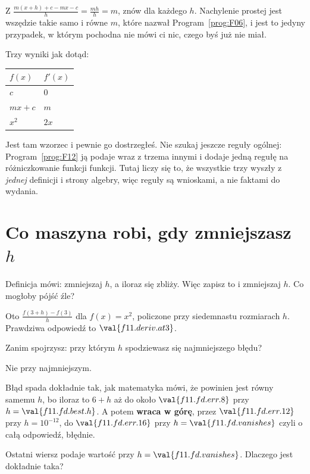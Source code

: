 \begin{fr}
Z $\frac{m(x+h) + c - mx - c}{h} = \frac{mh}{h} = m$, znów dla każdego $h$.
Nachylenie prostej jest wszędzie takie samo i równe $m$, które nazwał
Program~\ref{prog:F06}, i jest to jedyny przypadek, w którym pochodna nie mówi
ci nic, czego byś już nie miał.

Trzy wyniki jak dotąd:

\begin{center}
\begin{tabular}{ll}
\toprule
$f(x)$ & $f'(x)$ \\
\midrule
$c$ & $0$ \\
$mx + c$ & $m$ \\
$x^{2}$ & $2x$ \\
\bottomrule
\end{tabular}
\end{center}

Jest tam wzorzec i pewnie go dostrzegłeś. Nie szukaj jeszcze reguły ogólnej:
Program~\ref{prog:F12} ją podaje wraz z trzema innymi i dodaje jedną regułę na
różniczkowanie funkcji funkcji. Tutaj liczy się to, że wszystkie trzy wyszły z \emph{jednej}
definicji i strony algebry, więc reguły są wnioskami, a nie faktami do
wydania.
\end{fr}

\section{Co maszyna robi, gdy zmniejszasz $h$}
\label{sec:F11-machine}

\begin{fr}
Definicja mówi: zmniejszaj $h$, a iloraz się zbliży. Więc zapisz to i
zmniejszaj $h$. Co mogłoby pójść źle?

Oto $\frac{f(3+h) - f(3)}{h}$ dla $f(x) = x^{2}$, policzone przy siedemnastu
rozmiarach $h$. Prawdziwa odpowiedź to $\val{f11.deriv.at3}$.

Zanim spojrzysz: przy którym $h$ spodziewasz się najmniejszego błędu?
\dotline
\nextframe
\end{fr}

\begin{fr}
\begin{ansblock}
Nie przy najmniejszym.
\end{ansblock}


Błąd spada dokładnie tak, jak matematyka mówi, że powinien \dash{} jest równy
samemu $h$, bo iloraz to $6 + h$ \dash{} aż do około $\val{f11.fd.err.8}$ przy
$h = \val{f11.fd.best.h}$. A potem \textbf{wraca w górę}, przez
$\val{f11.fd.err.12}$ przy $h = 10^{-12}$, do $\val{f11.fd.err.16}$ przy
$h = \val{f11.fd.vanishes}$ \dash{} czyli o całą odpowiedź, błędnie.

Ostatni wiersz podaje wartość przy $h = \val{f11.fd.vanishes}$. Dlaczego jest
dokładnie taka?
\nextframe
\end{fr}

